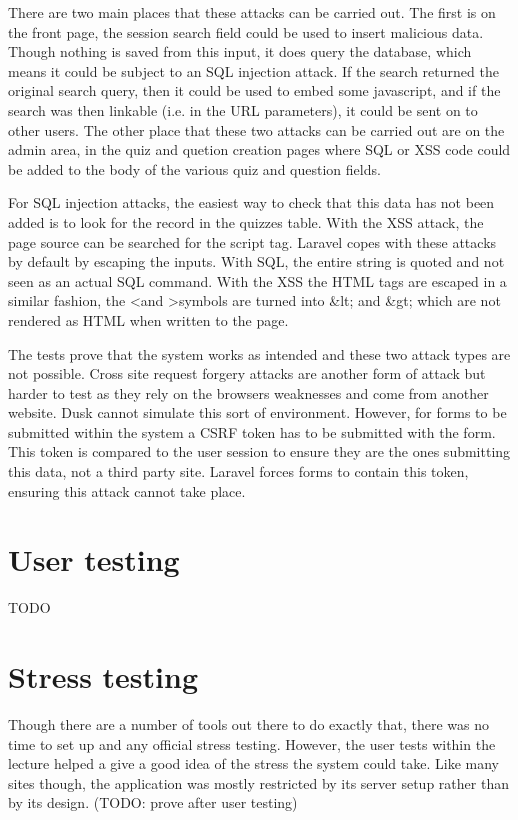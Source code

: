 There are two main places that these attacks can be carried out. The first is on the front page, the session search field could be used to insert malicious data. Though nothing is saved from this input, it does query the database, which means it could be subject to an SQL injection attack. If the search returned the original search query, then it could be used to embed some javascript, and if the search was then linkable (i.e. in the URL parameters), it could be sent on to other users. The other place that these two attacks can be carried out are on the admin area, in the quiz and quetion creation pages where SQL or XSS code could be added to the body of the various quiz and question fields.

For SQL injection attacks, the easiest way to check that this data has not been added is to look for the record in the quizzes table. With the XSS attack, the page source can be searched for the script tag. Laravel copes with these attacks by default by escaping the inputs\cite{laravel-web-attacks}. With SQL, the entire string is quoted and not seen as an actual SQL command. With the XSS the HTML tags are escaped in a similar fashion, the \textless and \textgreater symbols are turned into \&lt; and \&gt; which are not rendered as HTML when written to the page.

The tests prove that the system works as intended and these two attack types are not possible. Cross site request forgery attacks are another form of attack but harder to test as they rely on the browsers weaknesses and come from another website. Dusk cannot simulate this sort of environment. However, for forms to be submitted within the system a CSRF token has to be submitted with the form. This token is compared to the user session to ensure they are the ones submitting this data, not a third party site. Laravel forces forms to contain this token, ensuring this attack cannot take place. 

\section{User testing}
TODO

\section{Stress testing}
Though there are a number of tools out there to do exactly that, there was no time to set up and any official stress testing. However, the user tests within the lecture helped a give a good idea of the stress the system could take. Like many sites though, the application was mostly restricted by its server setup rather than by its design. (TODO: prove after user testing)

